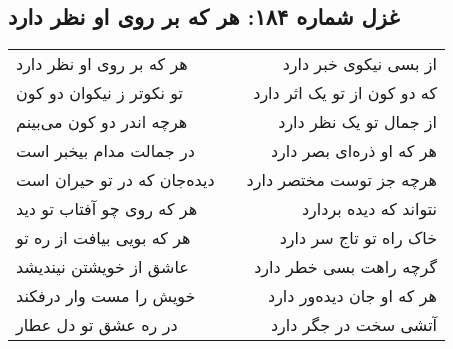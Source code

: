 \begin{center}
\section*{غزل شماره ۱۸۴: هر که بر روی او نظر دارد}
\label{sec:184}
\begin{longtable}{l p{0.5cm} r}
هر که بر روی او نظر دارد
&&
از بسی نیکوی خبر دارد
\\
تو نکوتر ز نیکوان دو کون
&&
که دو کون از تو یک اثر دارد
\\
هرچه اندر دو کون می‌بینم
&&
از جمال تو یک نظر دارد
\\
در جمالت مدام بیخبر است
&&
هر که او ذره‌ای بصر دارد
\\
دیده‌جان که در تو حیران است
&&
هرچه جز توست مختصر دارد
\\
هر که روی چو آفتاب تو دید
&&
نتواند که دیده بردارد
\\
هر که بویی بیافت از ره تو
&&
خاک راه تو تاج سر دارد
\\
عاشق از خویشتن نیندیشد
&&
گرچه راهت بسی خطر دارد
\\
خویش را مست وار درفکند
&&
هر که او جان دیده‌ور دارد
\\
در ره عشق تو دل عطار
&&
آتشی سخت در جگر دارد
\\
\end{longtable}
\end{center}
